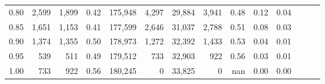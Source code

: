 \begin{tabular}{rrrrrrrrrrrrrr}
0.80 &   2,599 &  1,899 &  0.42 &  175,948 &    4,297 &  29,884 &   3,941 &  0.48 &  0.12 &      0.04 \\
0.85 &   1,651 &  1,153 &  0.41 &  177,599 &    2,646 &  31,037 &   2,788 &  0.51 &  0.08 &      0.03 \\
0.90 &   1,374 &  1,355 &  0.50 &  178,973 &    1,272 &  32,392 &   1,433 &  0.53 &  0.04 &      0.01 \\
0.95 &     539 &    511 &  0.49 &  179,512 &      733 &  32,903 &     922 &  0.56 &  0.03 &      0.01 \\
1.00 &     733 &    922 &  0.56 &  180,245 &        0 &  33,825 &       0 &   nan &  0.00 &      0.00 \\
\bottomrule
\end{tabular}
